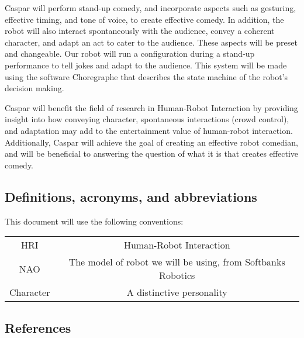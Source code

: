 \documentclass[onecolumn, draftclsnofoot,10pt, compsoc]{IEEEtran}
\begin{document}
Caspar will perform stand-up comedy, and incorporate aspects such as gesturing, effective timing, and tone of voice, to create effective comedy. In addition, the robot will also interact spontaneously with the audience, convey a coherent character, and adapt an act to cater to the audience. These aspects will be preset and changeable. Our robot will run a configuration during a stand-up performance to tell jokes and adapt to the audience. This system will be made using the software Choregraphe that describes the state machine of the robot’s decision making.

Caspar will benefit the field of research in Human-Robot Interaction by  providing insight into how conveying character, spontaneous interactions (crowd control), and adaptation may add to the entertainment value of human-robot interaction. Additionally, Caspar will achieve the goal of creating an effective robot comedian, and will be beneficial to answering the question of what it is that creates effective comedy.


\subsection{Definitions, acronyms, and abbreviations}
This document will use the following conventions:
\begin{center}
\begin{tabular}{ |c|c| }
 \hline
 HRI & Human-Robot Interaction \\
 NAO & The model of robot we will be using, from Softbanks Robotics \\
 Character & A distinctive personality \\
 \hline
\end{tabular}
\end{center}

\subsection{References}

\end{document}
